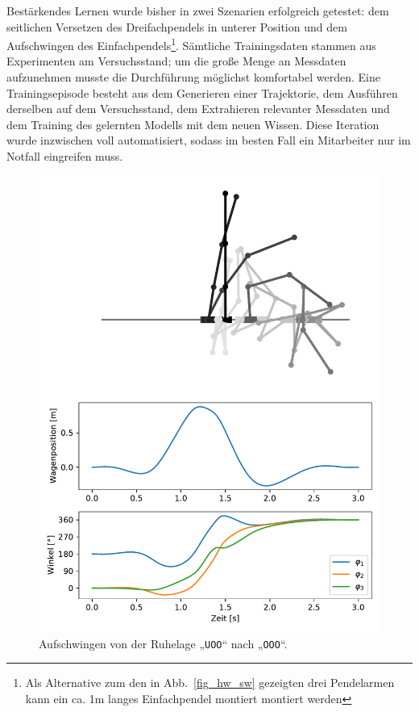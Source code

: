 \documentclass[a4paper,10pt]{scrartcl}
\newcommand{\figref}[1]{Abb.~\ref{#1}}
\begin{document}
\medskip
Bestärkendes Lernen wurde bisher in zwei Szenarien erfolgreich getestet: dem seitlichen Versetzen des Dreifachpendels in unterer Position und dem Aufschwingen des Einfachpendels\footnote{Als Alternative zum den in \figref{fig_hw_sw} gezeigten drei Pendelarmen kann ein ca. 1m langes Einfachpendel montiert montiert werden}. Sämtliche Trainingsdaten stammen aus Experimenten am Versuchsstand; um die große Menge an Messdaten aufzunehmen musste die Durchführung möglichst komfortabel werden. Eine Trainingsepisode besteht aus dem Generieren einer Trajektorie, dem Ausführen derselben auf dem Versuchsstand, dem Extrahieren relevanter Messdaten und dem Training des gelernten Modells mit dem neuen Wissen. Diese Iteration wurde inzwischen voll automatisiert, sodass im besten Fall ein Mitarbeiter nur im Notfall eingreifen muss.

\begin{figure}
    \centering
    \includegraphics[scale=0.7]{img/uoo_ooo_3.0_around.csv.pdf}
    \caption{Aufschwingen von der Ruhelage „\texttt{UOO}“ nach „\texttt{OOO}“.}
    \label{fig:uoo_ooo}
\end{figure}
    
\end{document}
